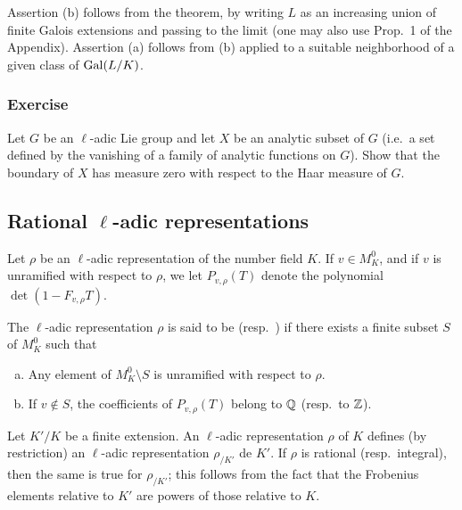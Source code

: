 Assertion (b) follows from the theorem, by writing $L$ as an increasing union
of finite Galois extensions and passing to the limit (one may also use Prop.~1
of the Appendix). Assertion (a) follows from (b) applied to a suitable
neighborhood of a given class of $\operatorname{Gal}(L/K)$.

\subsubsection*{Exercise}
Let $G$ be an $\ell$-adic Lie group and let $X$ be an analytic subset of $G$
(i.e.\ a set defined by the vanishing of a family of analytic functions on $G$).
Show that the boundary of $X$ has measure zero
\dpage
with respect to the Haar measure of $G$.

\subsection{Rational \texorpdfstring{$\ell$}{ℓ}-adic representations}
\label{sec:I_23}
Let $\rho$ be an $\ell$-adic representation of the number field $K$. If $v \in
M_K^0$, and if $v$ is unramified with respect to $\rho$, we let $P_{v,\rho}(T)$
denote the polynomial $\det(1 - F_{v,\rho} T)$.

\begin{mydef}
The $\ell$-adic representation $\rho$ is said to be
 (resp.\ 
) if there exists a finite
subset $S$ of $M_K^0$ such that
\begin{enumerate}[(a)]
	\item Any element of $M_K^0 \setminus S$ is unramified with respect to 
	$\rho$.
	\item If $v \not\in S$, the coefficients of $P_{v,\rho}(T)$ belong to
		$\mathbb{Q}$ (resp.\ to $\mathbb{Z}$).
\end{enumerate}
\end{mydef}

\begin{obs}\label{rmk:I_23_1}
	Let $K'/K$ be a finite extension. An $\ell$-adic representation $\rho$
	of $K$ defines (by restriction) an $\ell$-adic representation
	$\rho_{/K'}$ de $K'$. If $\rho$ is rational (resp.\ integral), then the
	same is true for $\rho_{/K'}$; this follows from the fact that the
	Frobenius elements relative to $K'$ are powers of those relative to
	$K$.
\end{obs}

